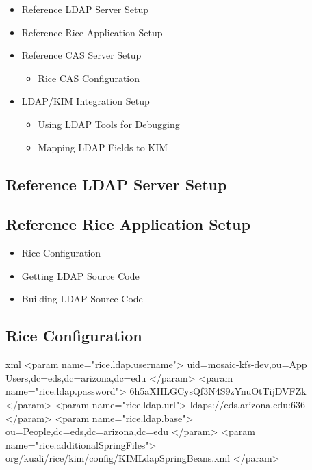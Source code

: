 \documentclass[12pt,notitlepage]{article}
\begin{document}
\begin{s5presentation}
\begin{s5slide}
    \begin{itemize}
      \item Reference LDAP Server Setup
      \item Reference Rice Application Setup
      \item Reference CAS Server Setup
        \begin{itemize}
        \item Rice CAS Configuration
        \end{itemize}
      \item LDAP/KIM Integration Setup
        \begin{itemize}
          \item Using LDAP Tools for Debugging
          \item Mapping LDAP Fields to KIM
        \end{itemize}
      \end{itemize}
    \W \end{s5slide}

%
%
  \W \begin{s5slide}
    \section{Reference LDAP Server Setup}

    \W \end{s5slide}

%
%
  \W \begin{s5slide}
    \section{Reference Rice Application Setup}
    \begin{itemize}
      \item Rice Configuration
      \item Getting LDAP Source Code
      \item Building LDAP Source Code
    \end{itemize}
    \W \end{s5slide}

%
%
  \W \begin{s5slide}
    \section{Rice Configuration}
\begin{code}{xml}
<param name="rice.ldap.username">
    uid=mosaic-kfs-dev,ou=App Users,dc=eds,dc=arizona,dc=edu
</param>
<param name="rice.ldap.password">
    6h5aXHLGCysQf3N4S9zYnuOtTijDVFZk
</param>
<param name="rice.ldap.url">
    ldaps://eds.arizona.edu:636
</param>
<param name="rice.ldap.base">
    ou=People,dc=eds,dc=arizona,dc=edu
</param>
<param name="rice.additionalSpringFiles">
    org/kuali/rice/kim/config/KIMLdapSpringBeans.xml
</param>
  \end{code}
    \W \end{s5slide}


\end{s5presentation}
\end{document}
